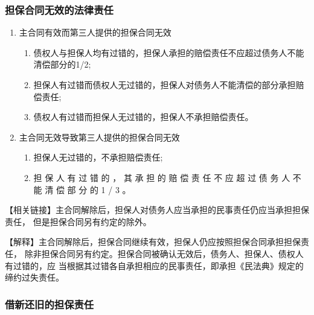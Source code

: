 \documentclass[UTF8,12pt]{ctexart}
\numberwithin{equation}{section} %
\numberwithin{figure}{section}
\numberwithin{table}{section}
\begin{document}
	\subsubsection{担保合同无效的法律责任}
	
	\begin{enumerate}
		\item 主合同有效而第三人提供的担保合同无效
		\begin{enumerate}
			\item 债权人与担保人均有过错的，担保人承担的赔偿责任不应超过债务人不能清偿部分的1/2; 
			
			\item 担保人有过错而债权人无过错的，担保人对债务人不能清偿的部分承担赔偿责任; 
			
			\item 债权人有过错而担保人无过错的，担保人不承担赔偿责任。
		\end{enumerate}
		
		\item 主合同无效导致第三人提供的担保合同无效
		\begin{enumerate}
			\item 担保人无过错的，不承担赔偿责任;
			
			\item 担 保 人 有 过 错 的 ， 其 承 担 的 赔 偿 责 任 不 应 超 过 债 务 人 不 能 清 偿 部 分 的 1 / 3 。
		\end{enumerate}
	\end{enumerate}
	
	【相关链接】主合同解除后，担保人对债务人应当承担的民事责任仍应当承担担保责任， 但是担保合同另有约定的除外。
	
	【解释】主合同解除后，担保合同继续有效，担保人仍应按照担保合同承担担保责任， 除非担保合同另有约定。担保合同被确认无效后，债务人、担保人、债权人有过错的，应 当根据其过错各自承担相应的民事责任，即承担《民法典》规定的缔约过失责任。
	
	\subsubsection{借新还旧的担保责任}
	
\end{document}
